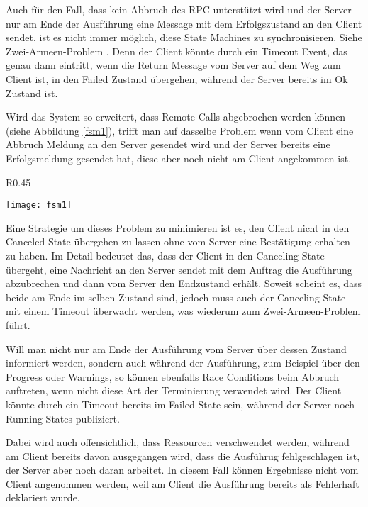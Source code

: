 Auch für den Fall, dass kein Abbruch des RPC unterstützt wird und der Server nur am Ende der Ausführung eine Message mit dem Erfolgszustand an den Client sendet, ist es nicht immer möglich, diese State Machines zu synchronisieren. Siehe Zwei-Armeen-Problem \cite{tanenbaum4andrew}.
Denn der Client könnte durch ein Timeout Event, das genau dann eintritt, wenn die Return Message vom Server auf dem Weg zum Client ist, in den Failed Zustand übergehen, während der Server bereits im Ok Zustand ist.

Wird das System so erweitert, dass Remote Calls abgebrochen werden können (siehe Abbildung \ref{fsm1}), trifft man auf dasselbe Problem wenn vom Client eine Abbruch Meldung an den Server gesendet wird und der Server bereits eine Erfolgsmeldung gesendet hat, diese aber noch nicht am Client angekommen ist.
\begin{wrapfigure}{R}{0.45\textwidth}
  \vspace{-20pt}
  \begin{center}
    \texttt{[image: fsm1]}
  \end{center}
  \caption{Erweiterte State Machine eines abbrechbaren RPC}
  \label{fsm1}
\end{wrapfigure}
Eine Strategie um dieses Problem zu minimieren ist es, den Client nicht in den Canceled State übergehen zu lassen ohne vom Server eine Bestätigung erhalten zu haben.
Im Detail bedeutet das, dass der Client in den Canceling State übergeht, eine Nachricht an den Server sendet mit dem Auftrag die Ausführung abzubrechen und dann vom Server den Endzustand erhält.
Soweit scheint es, dass beide am Ende im selben Zustand sind, jedoch muss auch der Canceling State mit einem Timeout überwacht werden, was wiederum zum Zwei-Armeen-Problem führt.

Will man nicht nur am Ende der Ausführung vom Server über dessen Zustand informiert werden, sondern auch während der Ausführung, zum Beispiel über den Progress oder Warnings, so können ebenfalls Race Conditions beim Abbruch auftreten, wenn nicht diese Art der Terminierung verwendet wird.
Der Client könnte durch ein Timeout bereits im Failed State sein, während der Server noch Running States publiziert.

Dabei wird auch offensichtlich, dass Ressourcen verschwendet werden,  während am Client bereits davon ausgegangen wird, dass die Ausführug fehlgeschlagen ist, der Server aber noch daran arbeitet.
In diesem Fall können Ergebnisse nicht vom Client angenommen werden, weil am Client die Ausführung bereits als Fehlerhaft deklariert wurde.

